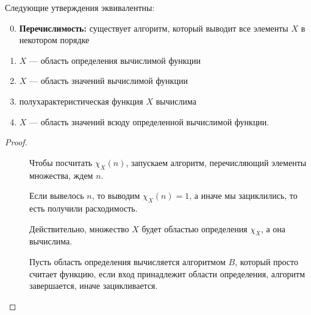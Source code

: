 \begin{thm}
    Следующие утверждения эквивалентны:
    \begin{enumerate}
		\setcounter{enumi}{-1}
		\item \textbf{Перечислимость:} существует алгоритм, который выводит все элементы $ X$ в некотором порядке
		\item $ X$ --- область определения вычислимой функции
		\item $ X$ --- область значений вычислимой функции
		\item полухарактеристическая функция $ X$ вычислима
		\item $ X$ --- область значений всюду определенной вычислимой функции.
    \end{enumerate} 
\end{thm}
\begin{proof}
    ~\begin{description}
		\item[]
	    Чтобы посчитать $ \chi_{X}(n)$, запускаем алгоритм, перечисляющий элементы множества, ждем $ n$.

	    Если вывелось $ n$, то выводим $ \chi_{X}(n) = 1$, а иначе мы зациклились, то есть получили расходимость.
	\item[] 
	    Действительно, множество $ X$ будет областью определения $ \chi_{X}$, а она вычислима. 
	\item[]
		Пусть область определения вычисляется алгоритмом $ B$, который просто считает функцию, если вход принадлежит области определения, алгоритм завершается, иначе зацикливается.


\end{description}
\end{proof}

